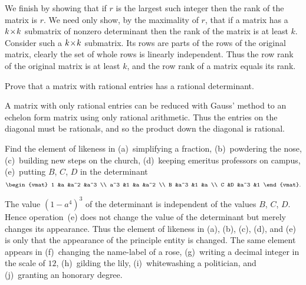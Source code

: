 \begin{exercises}
\begin{answer}
      We finish by showing that if \( r \) is the largest such integer then
      the rank of the matrix is \( r \).
      We need only show, by the maximality of \( r \),
      that if a matrix has a \( k \! \times \! k \) submatrix of
      nonzero determinant then the rank of the matrix is at least \( k \).
      Consider such a \( k \! \times \! k \) submatrix.
      Its rows are parts of the rows of the original matrix, clearly the
      set of whole rows is linearly independent.
      Thus the row rank of the original matrix is at least \( k \), and the row
      rank of a matrix equals its rank.  
   \end{answer}
  \recommended \item
    Prove that a matrix with rational entries has a rational determinant.
    \begin{answer}
      A matrix with only rational entries can be reduced with Gauss'
      method to an echelon form matrix using only rational arithmetic.
      Thus the entries on the diagonal must be rationals, and so the product
      down the diagonal is rational.  
    \end{answer}
  \puzzle \item 
     \cite{Monthly53p115}
     Find the element of likeness in (a)~simplifying a fraction, (b)~powdering
     the nose, (c)~building new steps on the church, (d)~keeping emeritus
     professors on campus, (e)~putting \( B \), \( C \), \( D \) in the
     determinant
     \begin{equation*}
       \begin{vmat}
         1   &a   &a^2  &a^3  \\
         a^3 &1   &a    &a^2  \\
         B   &a^3 &1    &a    \\
         C   &D   &a^3  &1
       \end{vmat}.
     \end{equation*}
     \begin{answer}
       \answerasgiven
       The value \( (1-a^4)^3 \) of the determinant is independent of the
       values \( B \), \( C \), \( D \).
       Hence operation~(e) does not change the value of the determinant
       but merely changes its appearance.
       Thus the element of likeness in (a), (b), (c), (d), and (e) is
       only that the appearance of the principle entity is changed.
       The same element appears in (f)~changing the name-label of a rose,
       (g)~writing a decimal integer in the scale of \( 12 \), (h)~gilding
       the lily, (i)~whitewashing a politician, and (j)~granting an honorary
       degree.  
    \end{answer}
\end{exercises}



















